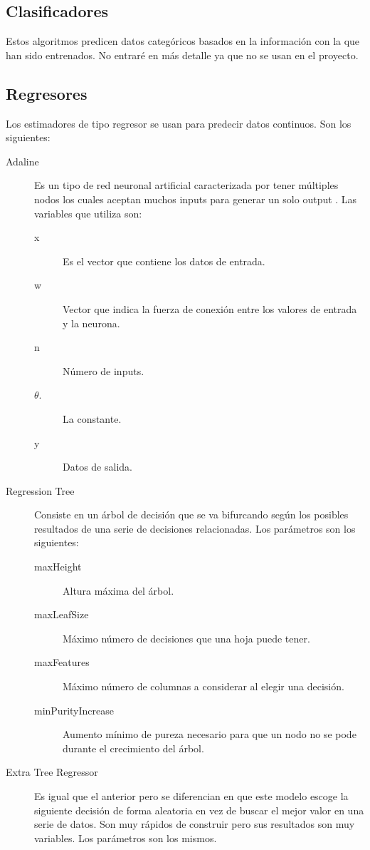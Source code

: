 \subsection{Clasificadores}
Estos algoritmos predicen datos categóricos basados en la información con la que han sido entrenados. No entraré en más detalle ya que no se usan en el proyecto.
\subsection{Regresores}
Los estimadores de tipo regresor se usan para predecir datos continuos. Son los siguientes:
\begin{description}
    \item [Adaline] Es un tipo de red neuronal artificial caracterizada por tener múltiples nodos los cuales aceptan muchos inputs para generar un solo output \cite{Adaline}. Las variables que utiliza son:
    \begin{description}
        \item [x] Es el vector que contiene los datos de entrada.
        \item [w] Vector que indica la fuerza de conexión entre los valores de entrada y la neurona.
        \item [n] Número de inputs.
        \item [\begin{math}\theta \end{math}.] La constante.
        \item [y] Datos de salida.
    \end{description}
	\item [Regression Tree] Consiste en un árbol de decisión que se va bifurcando según los posibles resultados de una serie de decisiones relacionadas. Los parámetros son los siguientes:
	\begin{description}
	    \item [maxHeight] Altura máxima del árbol.
	    \item [maxLeafSize] Máximo número de decisiones que una hoja puede tener.
	    \item [maxFeatures] Máximo número de columnas a considerar al elegir una decisión.
	    \item [minPurityIncrease] Aumento mínimo de pureza necesario para que un nodo no se pode durante el crecimiento del árbol.
	\end{description}
	\item [Extra Tree Regressor] Es igual que el anterior pero se diferencian en que este modelo escoge la siguiente decisión de forma aleatoria en vez de buscar el mejor valor en una serie de datos. Son muy rápidos de construir pero sus resultados son muy variables. Los parámetros son los mismos.

\end{description}
